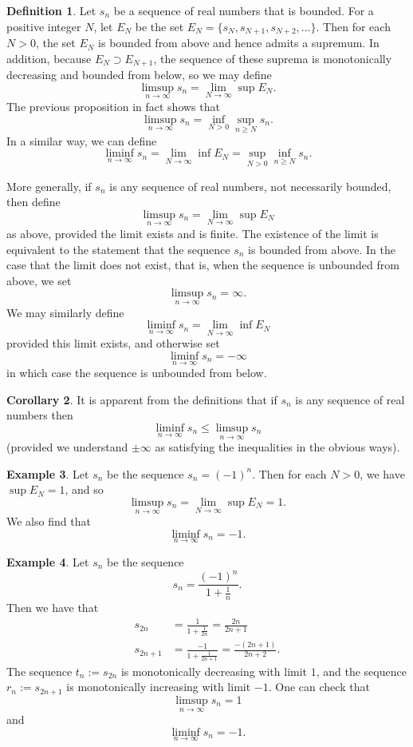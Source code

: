 \documentclass[12pt]{article}
\theoremstyle{definition}
\newtheorem{definition}{Definition}
\newtheorem{example}[definition]{Example}
\theoremstyle{theorem}
\newtheorem{corollary}[definition]{Corollary}
\begin{document}
\begin{definition}
Let $s_n$ be a sequence of real numbers that is bounded. For a positive integer $N$, let $E_N$ be the set $E_{N} = \{s_N, s_{N+1}, s_{N+2}, \ldots \}$. Then for each $N > 0$, the set $E_N$ is bounded from above and hence admits a supremum. In addition, because $E_{N} \supset E_{N+1}$, the sequence of these suprema is monotonically decreasing and bounded from below, so we may define 
\[
\limsup_{n \to \infty} s_n = \lim_{N \to \infty} \sup E_N.
\]
The previous proposition in fact shows that 
\[
\limsup_{n \to \infty}s_n = \inf_{N > 0} \sup_{n \geqslant N} s_n.
\]
In a similar way, we can define 
\[
\liminf_{n \to \infty}s_n = \lim_{N \to \infty} \inf E_N = \sup_{N >0} \inf_{n \geqslant N} s_n. 
\]

More generally, if $s_n$ is any sequence of real numbers, not necessarily bounded, then define 
\[
\limsup_{n \to \infty}s_n = \lim_{N \to \infty} \sup E_N
\]
as above, provided the limit exists and is finite. The existence of the limit is equivalent to the statement that the sequence $s_n$ is bounded from above.  In the case that the limit does not exist, that is, when the sequence is unbounded from above, we set 
\[
\limsup_{n \to \infty} s_n = \infty.
\] 
We may similarly define 
\[
\liminf_{n \to \infty} s_n = \lim_{N \to \infty} \inf E_N
\]
provided this limit exists, and otherwise set 
\[
\liminf_{n \to \infty} s_n = -\infty
\]
in which case the sequence is unbounded from below. 
\end{definition}

\begin{corollary}
It is apparent from the definitions that if $s_n$ is any sequence of real numbers then 
\[
\liminf_{n \to \infty}s_n \leqslant \limsup_{n \to \infty}s_n
\]
(provided we understand $\pm \infty$ as satisfying the inequalities in the obvious ways).
\end{corollary}

\begin{example}
Let $s_n$ be the sequence $s_n = (-1)^n$. Then for each $N > 0$, we have $\sup E_N = 1$, and so 
\[
\limsup_{n \to \infty}s_n = \lim_{N \to \infty} \sup E_N = 1. 
\]
We also find that 
\[
\liminf_{n \to \infty} s_n = -1.
\]
\end{example}

\begin{example}
Let $s_n$ be the sequence 
\[
s_n = \frac{(-1)^n}{1 + \frac{1}{n}}.
\]
Then we have that 
\begin{align*}
s_{2n} &= \frac{1}{1 + \frac{1}{2n}} = \frac{2n}{2n+1} \\
s_{2n+1} &= \frac{-1}{1 + \frac{1}{2n+1}} = \frac{-(2n+1)}{2n+2}.
\end{align*}
The sequence $t_n := s_{2n}$ is monotonically decreasing with limit $1$, and the sequence $r_n := s_{2n+1}$ is monotonically increasing with limit $-1$. One can check that 
\[
\limsup_{n \to \infty} s_n = 1
\]
and 
\[
\liminf_{n \to \infty} s_n = -1.
\]
\end{example}
\end{document}
